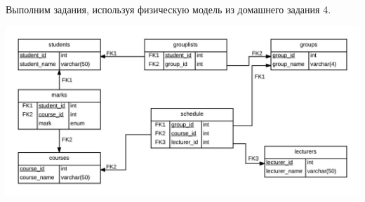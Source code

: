 \documentclass[10pt, a4paper]{article}
\title{}
\author{Андрей Козлов, гр. 4538}
\date{}
\begin{document}
\maketitle

Выполним задания, используя физическую модель из домашнего задания 4.
\begin{center}
	\includegraphics[scale=0.2]{pdm}
\end{center}
\end{document}
